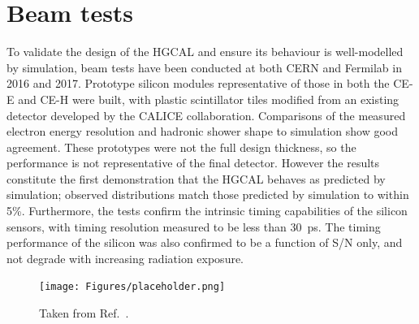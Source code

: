 \section{Beam tests}

To validate the design of the HGCAL and ensure its behaviour is well-modelled by simulation, beam tests have been conducted at both CERN and Fermilab in 2016 and 2017. 
Prototype silicon modules representative of those in both the CE-E and CE-H were built, with plastic scintillator tiles modified from an existing detector developed by the CALICE collaboration.
Comparisons of the measured electron energy resolution and hadronic shower shape to simulation show good agreement.
These prototypes were not the full design thickness, so the performance is not representative of the final detector.
However the results constitute the first demonstration that the HGCAL behaves as predicted by simulation; observed distributions match those predicted by simulation to within 5\%. 
Furthermore, the tests confirm the intrinsic timing capabilities of the silicon sensors, with timing resolution measured to be less than \SI{30}{\pico\second}.
The timing performance of the silicon was also confirmed to be a function of S/N only, and not degrade with increasing radiation exposure. 

\begin{figure}[h!]
  \centering
  \texttt{[image: Figures/placeholder.png]}
  \caption[Comparison of data and simulation in HGCAL beam tests.]
  {
    Taken from Ref.~\cite{HGCAL}.
  }
  \label{fig:hgcal_BeamTest}
\end{figure}
